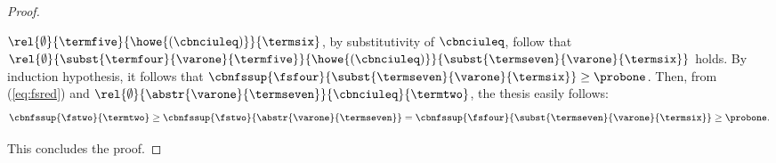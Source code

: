 \begin{proof}
\begin{varitemize}
\begin{varitemize}
      $\rel{\emptyset}{\termfive}{\howe{(\cbnciuleq)}}{\termsix}$, by
      substitutivity of $\cbnciuleq$, follow that
      $\rel{\emptyset}{\subst{\termfour}{\varone}{\termfive}}{\howe{(\cbnciuleq)}}{\subst{\termseven}{\varone}{\termsix}}$
      holds. By induction hypothesis, it follows that
      $\cbnfssup{\fsfour}{\subst{\termseven}{\varone}{\termsix}}\geq\probone$. Then,
      from (\ref{eq:fsred}) and
      $\rel{\emptyset}{\abstr{\varone}{\termseven}}{\cbnciuleq}{\termtwo}$,
      the thesis easily follows:
      $$
      \cbnfssup{\fstwo}{\termtwo}\geq\cbnfssup{\fstwo}{\abstr{\varone}{\termseven}}=
      \cbnfssup{\fsfour}{\subst{\termseven}{\varone}{\termsix}}\geq\probone.
      $$
    \end{varitemize}
  \end{varitemize}
  This concludes the proof.
\end{proof}

